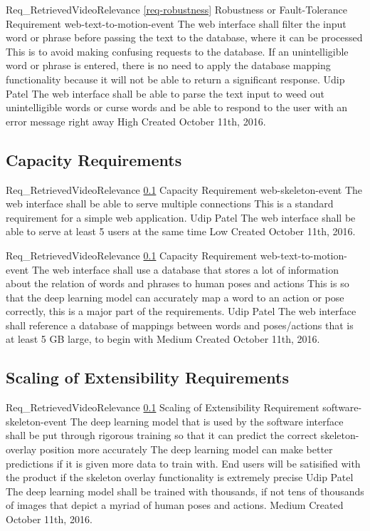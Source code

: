 \documentclass{scrreprt}
\begin{document}
\requirement
{Req_RetrievedVideoRelevance}
{\ref{req-robustness} Robustness or Fault-Tolerance Requirement}
{web-text-to-motion-event}
{The web interface shall filter the input word or phrase before passing the text to the database, where it can be processed}
{This is to avoid making confusing requests to the database. If an unintelligible word or phrase is entered, there is no need to apply the database mapping functionality because it will not be able to return a significant response.}
{Udip Patel}
{The web interface shall be able to parse the text input to weed out unintelligible words or curse words and be able to respond to the user with an error message right away }
{High}
{Created October 11th, 2016.}

\subsection{Capacity Requirements}
\label{req-capacity}

\requirement
{Req_RetrievedVideoRelevance}
{\ref{req-capacity} Capacity Requirement}
{web-skeleton-event}
{The web interface shall be able to serve multiple connections}
{This is a standard requirement for a simple web application.}
{Udip Patel}
{The web interface shall be able to serve at least 5 users at the same time}
{Low}
{Created October 11th, 2016.}

\requirement
{Req_RetrievedVideoRelevance}
{\ref{req-capacity} Capacity Requirement}
{web-text-to-motion-event}
{The web interface shall use a database that stores a lot of information about the relation of words and phrases to human poses and actions}
{This is so that the deep learning model can accurately map a word to an action or pose correctly, this is a major part of the requirements.}
{Udip Patel}
{The web interface shall reference a database of mappings between words and poses/actions that is at least 5 GB large, to begin with }
{Medium}
{Created October 11th, 2016.}


\subsection{Scaling of Extensibility Requirements}
\label{req-scaling}

\requirement
{Req_RetrievedVideoRelevance}
{\ref{req-capacity} Scaling of Extensibility Requirement}
{software-skeleton-event}
{The deep learning model that is used by the software interface shall be put through rigorous training so that it can predict the correct skeleton-overlay position more accurately}
{The deep learning model can make better predictions if it is given more data to train with. End users will be satisified with the product if the skeleton overlay functionality is extremely precise}
{Udip Patel}
{The deep learning model shall be trained with thousands, if not tens of thousands of images that depict a myriad of human poses and actions.}
{Medium}
{Created October 11th, 2016.}
\end{document}
